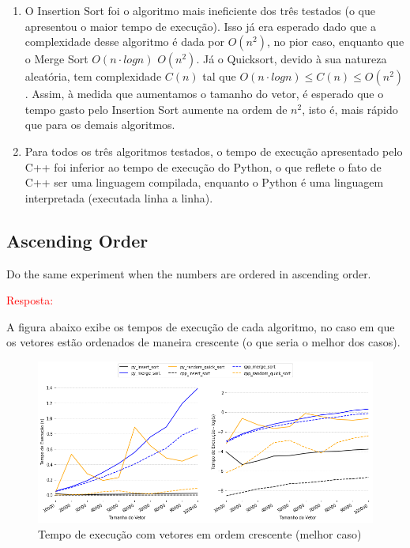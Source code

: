 \documentclass{article}
\begin{document}
    \begin{enumerate}
        \item O Insertion Sort foi o algoritmo mais ineficiente dos três testados (o que apresentou o maior tempo de execução). Isso já era esperado dado que a complexidade desse algoritmo é dada por $O(n^2)$, no pior caso, enquanto que o Merge Sort $O(n \cdot log n)$ $O(n^2)$. Já o Quicksort, devido à sua natureza aleatória, tem complexidade $C(n)$ tal que $O(n \cdot log n) \leq C(n) \leq O(n^2)$. Assim, à medida que aumentamos o tamanho do vetor, é esperado que o tempo gasto pelo Insertion Sort aumente na ordem de $n^2$, isto é, mais rápido que para os demais algoritmos. 
        
        \item Para todos os três algoritmos testados, o tempo de execução apresentado pelo C++ foi inferior ao tempo de execução do Python, o que reflete o fato de C++ ser uma linguagem compilada, enquanto o Python é uma linguagem interpretada (executada linha a linha). 
    \end{enumerate}

\subsection{Ascending Order}
Do the same experiment when the numbers are ordered in ascending order.

\vspace{\baselineskip} 
\textcolor{red}{Resposta:}

  A figura abaixo exibe os tempos de execução de cada algoritmo, no caso em que os vetores estão ordenados de maneira crescente (o que seria o melhor dos casos).  
\begin{figure}[!h]
    \centering
    \includegraphics[scale=0.5]{Figures/ascending.png}
    \caption{Tempo de execução com vetores em ordem crescente (melhor caso)}
    \label{fig:graf-random}
\end{figure}
\end{document}
